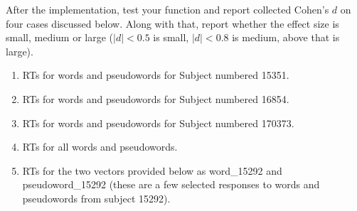 \documentclass[
]{article}
\providecommand{\tightlist}{%
  \setlength{\itemsep}{0pt}\setlength{\parskip}{0pt}}
\begin{document}
After the implementation, test your function and report collected
Cohen's \(d\) on four cases discussed below. Along with that, report
whether the effect size is small, medium or large (\(|d|<0.5\) is small,
\(|d|<0.8\) is medium, above that is large).

\begin{enumerate}
\def\labelenumi{\arabic{enumi}.}
\tightlist
\item
  RTs for words and pseudowords for Subject numbered 15351.
\item
  RTs for words and pseudowords for Subject numbered 16854.
\item
  RTs for words and pseudowords for Subject numbered 170373.
\item
  RTs for all words and pseudowords.
\item
  RTs for the two vectors provided below as word\_15292 and
  pseudoword\_15292 (these are a few selected responses to words and
  pseudowords from subject 15292).
\end{enumerate}
\end{document}
